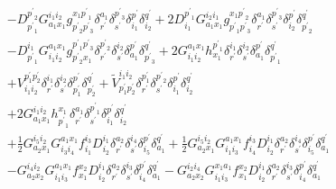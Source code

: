 \documentclass[aip,onecolumn,preprint]{revtex4-1}
\begin{document}
\begin{align}
  & - {{D^{{{p^\prime}_2}}_{{{p^\prime}_1}}}{G^{{i_1}{i_2}}_{{a_1}{x_1}}}{g^{{x_1}{{p^\prime}_1}}_{{{p^\prime}_2}{{p^\prime}_3}}}{\delta^{{a_1}}_{r^\prime}}{\delta^{{{p^\prime}_3}}_{s^\prime}}{\delta^{p^\prime}_{{i_1}}}{\delta^{q^\prime}_{{i_2}}}} + {{{2}}{D^{{{p^\prime}_1}}_{{i_1}}}{G^{{i_2}{i_1}}_{{a_1}{x_1}}}{g^{{x_1}{{p^\prime}_2}}_{{{p^\prime}_1}{{p^\prime}_3}}}{\delta^{{a_1}}_{r^\prime}}{\delta^{{{p^\prime}_3}}_{s^\prime}}{\delta^{p^\prime}_{{i_2}}}{\delta^{q^\prime}_{{{p^\prime}_2}}}} \nonumber \\
  & - {{D^{{i_1}}_{{{p^\prime}_1}}}{G^{{a_1}{x_1}}_{{i_1}{i_2}}}{g^{{{p^\prime}_1}{{p^\prime}_3}}_{{{p^\prime}_2}{x_1}}}{\delta^{{{p^\prime}_2}}_{r^\prime}}{\delta^{{i_2}}_{s^\prime}}{\delta^{p^\prime}_{{a_1}}}{\delta^{q^\prime}_{{{p^\prime}_3}}}} + {{{2}}{G^{{a_1}{x_1}}_{{i_1}{i_2}}}{h^{{{p^\prime}_1}}_{{x_1}}}{\delta^{{i_1}}_{r^\prime}}{\delta^{{i_2}}_{s^\prime}}{\delta^{p^\prime}_{{a_1}}}{\delta^{q^\prime}_{{{p^\prime}_1}}}} \nonumber \\
  & + {{V^{{p^{\prime}_1}{p^{\prime}_2}}_{{i_1}{i_2}}}{\delta^{{i_1}}_{r^\prime}}{\delta^{{i_2}}_{s^\prime}}{\delta^{p^\prime}_{{p^{\prime}_1}}}{\delta^{q^\prime}_{{p^{\prime}_2}}}} + {{\tilde{V}^{{i_1}{i_2}}_{{p^{\prime}_1}{p^{\prime}_2}}}{\delta^{{p^{\prime}_1}}_{r^\prime}}{\delta^{{{p^\prime}_2}}_{s^\prime}}{\delta^{p^\prime}_{{i_1}}}{\delta^{q^\prime}_{{i_2}}}} \nonumber \\
  & + {{{2}}{G^{{i_1}{i_2}}_{{a_1}{x_1}}}{h^{{x_1}}_{{{p^\prime}_1}}}{\delta^{{a_1}}_{r^\prime}}{\delta^{{{p^\prime}_1}}_{s^\prime}}{\delta^{p^\prime}_{{i_1}}}{\delta^{q^\prime}_{{i_2}}}} \nonumber \\
  & + {{{\frac{1}{2}}}{G^{{i_5}{i_2}}_{{a_2}{x_1}}}{G^{{a_1}{x_1}}_{{i_3}{i_4}}}{f^{{i_3}}_{{i_1}}}{D^{{i_1}}_{{i_2}}}{\delta^{{a_2}}_{r^\prime}}{\delta^{{i_4}}_{s^\prime}}{\delta^{p^\prime}_{{i_5}}}{\delta^{q^\prime}_{{a_1}}}} + {{{\frac{1}{2}}}{G^{{i_5}{i_2}}_{{a_2}{x_1}}}{G^{{a_1}{x_1}}_{{i_1}{i_3}}}{f^{{i_3}}_{{i_4}}}{D^{{i_1}}_{{i_2}}}{\delta^{{a_2}}_{r^\prime}}{\delta^{{i_4}}_{s^\prime}}{\delta^{p^\prime}_{{i_5}}}{\delta^{q^\prime}_{{a_1}}}} \nonumber \\
  & - {{G^{{i_4}{i_2}}_{{a_2}{x_2}}}{G^{{a_1}{x_1}}_{{i_1}{i_3}}}{f^{{x_2}}_{{x_1}}}{D^{{i_1}}_{{i_2}}}{\delta^{{a_2}}_{r^\prime}}{\delta^{{i_3}}_{s^\prime}}{\delta^{p^\prime}_{{i_4}}}{\delta^{q^\prime}_{{a_1}}}} 
  - {{G^{{i_2}{i_4}}_{{a_2}{x_2}}}{G^{{x_1}{a_1}}_{{i_1}{i_3}}}{f^{{x_2}}_{{x_1}}}{D^{{i_1}}_{{i_2}}}{\delta^{{a_2}}_{r^\prime}}{\delta^{{i_3}}_{s^\prime}}{\delta^{p^\prime}_{{i_4}}}{\delta^{q^\prime}_{{a_1}}}} \nonumber \\

\end{align}
\end{document}
